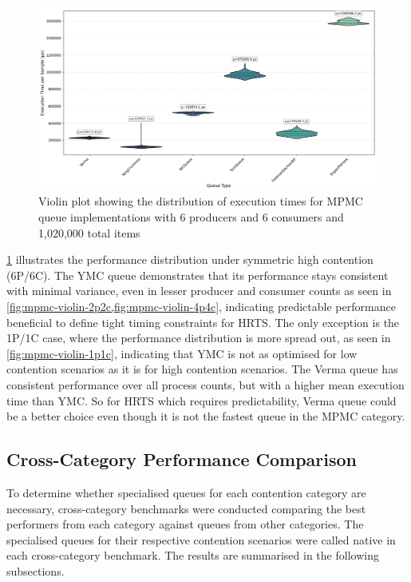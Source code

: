 \begin{figure}[htb]
\centering
\caption{Violin plot showing the distribution of execution times for MPMC queue implementations with 6 producers and 6 consumers and 1,020,000 total items}
\label{fig:mpmc-violin-6p6c}
\includegraphics[width=\textwidth]{images/results/mpmc_performance_violin_6P_6C.png}
\end{figure}

\cref{fig:mpmc-violin-6p6c} illustrates the performance distribution under symmetric high contention (6P/6C). The \ac{YMC} queue demonstrates that its performance stays consistent with minimal variance, even in lesser producer and consumer counts as seen in \cref{fig:mpmc-violin-2p2c,fig:mpmc-violin-4p4c}, indicating predictable performance beneficial to define tight timing constraints for \ac{HRTS}. The only exception is the 1P/1C case, where the performance distribution is more spread out, as seen in \cref{fig:mpmc-violin-1p1c}, indicating that \ac{YMC} is not as optimised for low contention scenarios as it is for high contention scenarios. The Verma queue has consistent performance over all process counts, but with a higher mean execution time than \ac{YMC}. So for \ac{HRTS} which requires predictability, Verma queue could be a better choice even though it is not the fastest queue in the \ac{MPMC} category.

\subsection{Cross-Category Performance Comparison}
To determine whether specialised queues for each contention category are necessary, cross-category benchmarks were conducted comparing the best performers from each category against queues from other categories. The specialised queues for their respective contention scenarios were called native in each cross-category benchmark. The results are summarised in the following subsections.


